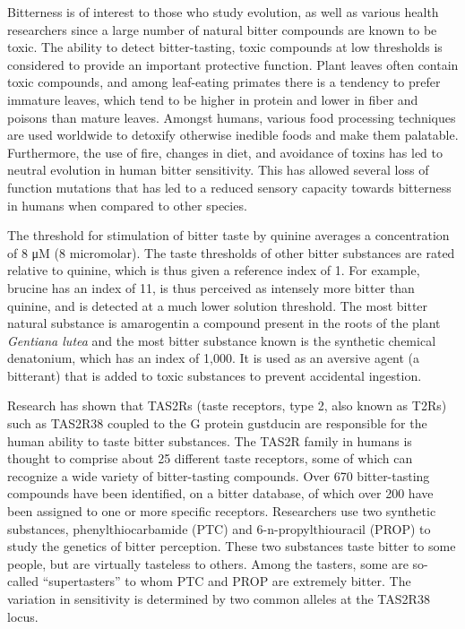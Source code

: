 \documentclass[]{book}
\begin{document}
Bitterness is of interest to those who study evolution, as well as various health researchers since a large number of natural bitter compounds are known to be toxic. The ability to detect bitter-tasting, toxic compounds at low thresholds is considered to provide an important protective function. Plant leaves often contain toxic compounds, and among leaf-eating primates there is a tendency to prefer immature leaves, which tend to be higher in protein and lower in fiber and poisons than mature leaves. Amongst humans, various food processing techniques are used worldwide to detoxify otherwise inedible foods and make them palatable. Furthermore, the use of fire, changes in diet, and avoidance of toxins has led to neutral evolution in human bitter sensitivity. This has allowed several loss of function mutations that has led to a reduced sensory capacity towards bitterness in humans when compared to other species.

The threshold for stimulation of bitter taste by quinine averages a concentration of 8 μM (8 micromolar). The taste thresholds of other bitter substances are rated relative to quinine, which is thus given a reference index of 1. For example, brucine has an index of 11, is thus perceived as intensely more bitter than quinine, and is detected at a much lower solution threshold. The most bitter natural substance is amarogentin a compound present in the roots of the plant \emph{Gentiana lutea} and the most bitter substance known is the synthetic chemical denatonium, which has an index of 1,000. It is used as an aversive agent (a bitterant) that is added to toxic substances to prevent accidental ingestion.

Research has shown that TAS2Rs (taste receptors, type 2, also known as T2Rs) such as TAS2R38 coupled to the G protein gustducin are responsible for the human ability to taste bitter substances. The TAS2R family in humans is thought to comprise about 25 different taste receptors, some of which can recognize a wide variety of bitter-tasting compounds. Over 670 bitter-tasting compounds have been identified, on a bitter database, of which over 200 have been assigned to one or more specific receptors. Researchers use two synthetic substances, phenylthiocarbamide (PTC) and 6-n-propylthiouracil (PROP) to study the genetics of bitter perception. These two substances taste bitter to some people, but are virtually tasteless to others. Among the tasters, some are so-called ``supertasters'' to whom PTC and PROP are extremely bitter. The variation in sensitivity is determined by two common alleles at the TAS2R38 locus.
\end{document}
